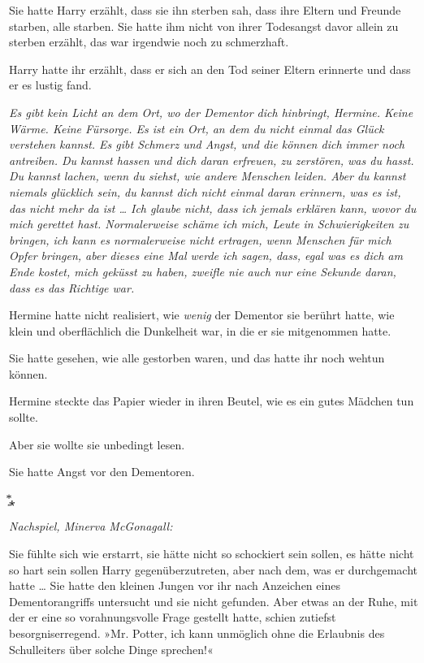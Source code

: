 {Sie hatte Harry erzählt, dass sie ihn sterben sah, dass ihre Eltern und Freunde starben, alle starben. Sie hatte ihm nicht von ihrer Todesangst davor allein zu sterben erzählt, das war irgendwie noch zu schmerzhaft.

Harry hatte ihr erzählt, dass er sich an den Tod seiner Eltern erinnerte und dass er es lustig fand.

\emph{Es gibt kein Licht an dem Ort, wo der Dementor dich hinbringt, Hermine. Keine Wärme. Keine Fürsorge. Es ist ein Ort, an dem du nicht einmal das Glück verstehen kannst. Es gibt Schmerz und Angst, und die können dich immer noch antreiben. Du kannst hassen und dich daran erfreuen, zu zerstören, was du hasst. Du kannst lachen, wenn du siehst, wie andere Menschen leiden. Aber du kannst niemals glücklich sein, du kannst dich nicht einmal daran erinnern, was es ist, das nicht mehr da ist … Ich glaube nicht, dass ich jemals erklären kann, wovor du mich gerettet hast. Normalerweise schäme ich mich, Leute in Schwierigkeiten zu bringen, ich kann es normalerweise nicht ertragen, wenn Menschen für mich Opfer bringen, aber dieses eine Mal werde ich sagen, dass, egal was es dich am Ende kostet, mich geküsst zu haben, zweifle nie auch nur eine Sekunde daran, dass es das Richtige war.}

Hermine hatte nicht realisiert, wie \emph{wenig} der Dementor sie berührt hatte, wie klein und oberflächlich die Dunkelheit war, in die er sie mitgenommen hatte.

Sie hatte gesehen, wie alle gestorben waren, und das hatte ihr noch wehtun können.

Hermine steckte das Papier wieder in ihren Beutel, wie es ein gutes Mädchen tun sollte.

Aber sie wollte sie unbedingt lesen.

Sie hatte Angst vor den Dementoren.

͙⃰⁎

\emph{Nachspiel, Minerva McGonagall:}

Sie fühlte sich wie erstarrt, sie hätte nicht so schockiert sein sollen, es hätte nicht so hart sein sollen Harry gegenüberzutreten, aber nach dem, was er durchgemacht hatte … Sie hatte den kleinen Jungen vor ihr nach Anzeichen eines Dementorangriffs untersucht und sie nicht gefunden. Aber etwas an der Ruhe, mit der er eine so vorahnungsvolle Frage gestellt hatte, schien zutiefst besorgniserregend. »Mr. Potter, ich kann unmöglich ohne die Erlaubnis des Schulleiters über solche Dinge sprechen!«

}

